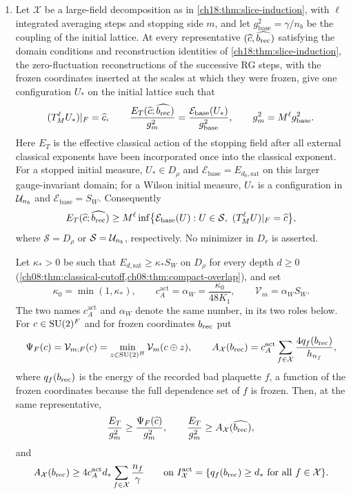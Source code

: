 \begin{theorem}
\begin{enumerate}
\item[(b)] Let $\mathcal X$ be a large-field decomposition as in \cref{ch18:thm:slice-induction}, with $\ell$ integrated averaging steps and stopping side $m$, and let $g_{\mathrm{base}}^2=\gamma/n_b$ be the coupling of the initial lattice. At every representative $(\widehat c,\widehat{b_{\mathrm{rec}}})$ satisfying the domain conditions and reconstruction identities of \cref{ch18:thm:slice-induction}, the zero-fluctuation reconstructions of the successive RG steps, with the frozen coordinates inserted at the scales at which they were frozen, give one configuration $U_*$ on the initial lattice such that
\[
 (T_M^\ell U_*)|_F=\widehat c,\qquad
 \frac{E_T(\widehat c;\widehat{b_{\mathrm{rec}}})}{g_m^2}=\frac{\mathcal E_{\mathrm{base}}(U_*)}{g_{\mathrm{base}}^2},\qquad
 g_m^2=M^\ell g_{\mathrm{base}}^2.
\]
Here $E_T$ is the effective classical action of the stopping field after all external classical exponents have been incorporated once into the classical exponent. For a stopped initial measure, $U_*\in D_\rho$ and $\mathcal E_{\mathrm{base}}=E_{d_0,\mathrm{sat}}$ on this larger gauge-invariant domain; for a Wilson initial measure, $U_*$ is a configuration in $\mathcal U_{n_b}$ and $\mathcal E_{\mathrm{base}}=S_W$. Consequently
\[
 E_T(\widehat c;\widehat{b_{\mathrm{rec}}})\ge M^\ell\inf\bigl\{\mathcal E_{\mathrm{base}}(U):U\in\mathcal S,\ (T_M^\ell U)|_F=\widehat c\bigr\},
\]
where $\mathcal S=D_\rho$ or $\mathcal S=\mathcal U_{n_b}$, respectively. No minimizer in $D_r$ is asserted.

Let $\kappa_*>0$ be such that $E_{d,\mathrm{sat}}\ge\kappa_*S_W$ on $D_\rho$ for every depth $d\ge0$ (\cref{ch08:thm:classical-cutoff,ch08:thm:compact-overlap}), and set
\[
 \kappa_0=\min(1,\kappa_*),\qquad
 c_A^{\mathrm{act}}=\alpha_W=\frac{\kappa_0}{48K_1},\qquad
 \mathcal V_m=\alpha_WS_W.
\]
The two names $c_A^{\mathrm{act}}$ and $\alpha_W$ denote the same number, in its two roles below. For $c\in\mathrm{SU}(2)^F$ and for frozen coordinates $b_{\mathrm{rec}}$ put
\[
 \Psi_F(c)=\mathcal V_{m;F}(c)=\min_{z\in\mathrm{SU}(2)^H}\mathcal V_m(c\oplus z),
 \qquad
 A_{\mathcal X}(b_{\mathrm{rec}})=c_A^{\mathrm{act}}\sum_{f\in\mathcal X}\frac{4q_f(b_{\mathrm{rec}})}{h_{n_f}},
\]
where $q_f(b_{\mathrm{rec}})$ is the energy of the recorded bad plaquette $f$, a function of the frozen coordinates because the full dependence set of $f$ is frozen. Then, at the same representative,
\begin{equation}\label{ch19:eq:two-lower-bounds}
 \frac{E_T}{g_m^2}\ge\frac{\Psi_F(\widehat c)}{g_m^2},\qquad
 \frac{E_T}{g_m^2}\ge A_{\mathcal X}(\widehat{b_{\mathrm{rec}}}),
\end{equation}
and
\[
 A_{\mathcal X}(b_{\mathrm{rec}})\ge4c_A^{\mathrm{act}}d_*\sum_{f\in\mathcal X}\frac{n_f}\gamma
 \qquad\text{on }I_{\mathcal X}^{\mathrm{act}}=\{q_f(b_{\mathrm{rec}})\ge d_*\text{ for all }f\in\mathcal X\}.
\]


\end{enumerate}
\end{theorem}

